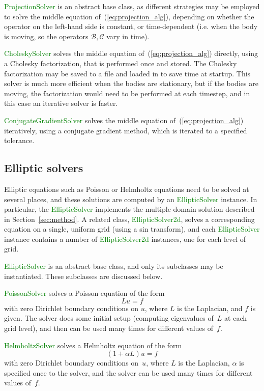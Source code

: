 \documentclass[11pt]{article}
\def\class#1{\textcolor{green}{\bf #1}}
\def\class#1{\textcolor{green}{\ttfamily\small #1}} %
\begin{document}
\class{ProjectionSolver} is an abstract base class, as different strategies may be employed to solve the middle equation of~(\ref{eq:projection_alg}), depending on whether the operator on the left-hand side is constant, or time-dependent (i.e. when the body is moving, so the operators $\mathcal{B},\mathcal{C}$ vary in time).

\class{CholeskySolver} solves the middle equation of~(\ref{eq:projection_alg}) directly, using a Cholesky factorization, that is performed once and stored.  The Cholesky factorization may be saved to a file and loaded in to save time at startup.  This solver is much more efficient when the bodies are stationary, but if the bodies are moving, the factorization would need to be performed at each timestep, and in this case an iterative solver is faster.

\class{ConjugateGradientSolver} solves the middle equation of~(\ref{eq:projection_alg}) iteratively, using a conjugate gradient method, which is iterated to a specified tolerance.

\subsection{Elliptic solvers}
\label{sub:elliptic_solvers}

Elliptic equations such as Poisson or Helmholtz equations need to be solved at several places, and these solutions are computed by an \class{EllipticSolver} instance.  In particular, the \class{EllipticSolver} implements the multiple-domain solution described in Section~\ref{sec:method}.  A related class, \class{EllipticSolver2d}, solves a corresponding equation on a single, uniform grid (using a sin transform), and each \class{EllipticSolver} instance contains a number of \class{EllipticSolver2d} instances, one for each level of grid.

\class{EllipticSolver} is an abstract base class, and only its subclasses may be instantiated.  These subclasses are discussed below.

\class{PoissonSolver} solves a Poisson equation of the form
\[
	Lu = f
\]
with zero Dirichlet boundary conditions on $u$, where $L$ is the Laplacian, and $f$ is given.  The solver does some initial setup (computing eigenvalues of~$L$ at each grid level), and then can be used many times for different values of~$f$.

\class{HelmholtzSolver} solves a Helmholtz equation of the form
\[
	(1+\alpha L)u = f
\]
with zero Dirichlet boundary conditions on~$u$, where $L$ is the Laplacian, $\alpha$ is specified once to the solver, and the solver can be used many times for different values of~$f$.


%

\end{document}
